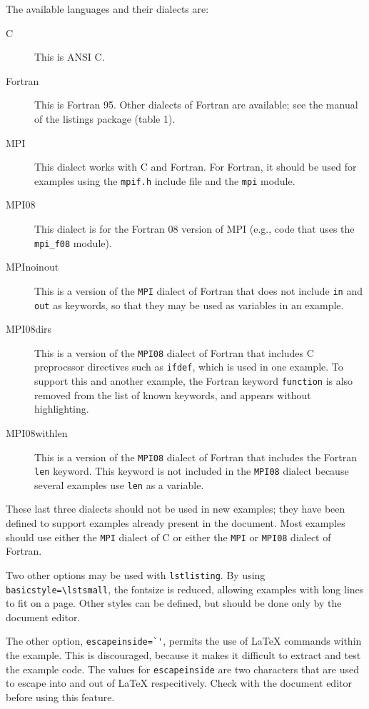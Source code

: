 \documentclass[letterpaper,twoside,11pt,fleqn]{article}
\begin{document}
The available languages and their dialects are:
\begin{description}
\item[C]This is ANSI C.
\item[Fortran]This is Fortran 95.  Other dialects of Fortran are
  available; see the manual of the listings package (table 1).
\item[MPI]This dialect works with C and Fortran. For Fortran, it
  should be used for examples using the \verb+mpif.h+ include file and
  the \verb+mpi+ module.
\item[MPI08]This dialect is for the Fortran 08 version of MPI (e.g.,
  code that uses the \verb+mpi_f08+ module).
\item[MPInoinout]This is a version of the \verb+MPI+ dialect of
  Fortran that does not include \texttt{in} and \texttt{out} as keywords,
  so that they may be used as variables in an example.
\item[MPI08dirs]This is a version of the \verb+MPI08+ dialect of
  Fortran that includes C preprocssor directives such as \verb+ifdef+,
  which is used in one example. To support this and another example,
  the Fortran keyword \texttt{function} is also removed from the list of
  known keywords, and appears without highlighting.
\item[MPI08withlen]This is a version of the \verb+MPI08+ dialect of
  Fortran that includes the Fortran \texttt{len} keyword. This keyword
  is not included in the \verb+MPI08+ dialect because several examples
  use \texttt{len} as a variable.
\end{description}
These last three dialects should not be used in new examples; they
have been defined to support examples already present in the document.
Most examples should use either the \verb+MPI+ dialect of C or either
the \verb+MPI+ or \verb+MPI08+ dialect of Fortran.

Two other options may be used with \verb+lstlisting+. By using\\
\verb+basicstyle=\lstsmall+, the fontsize is reduced, allowing
examples with long lines to fit on a page.
Other styles can be defined, but should be done only by the document
editor.

The other option, \verb+escapeinside=`'+, permits the use of LaTeX
commands within the example.
This is discouraged, because it makes it difficult to extract and test
the example code. The values for \verb+escapeinside+ are two
characters that are used to escape into and out of LaTeX
respecitively.
Check with the document editor before using this feature.
\end{document}
